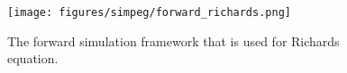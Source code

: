 \begin{figure}[!htbp]
\begin{center}
\texttt{[image: figures/simpeg/forward\_richards.png]}
\end{center}
\caption{
The forward simulation framework that is used for Richards equation.
}
\label{fig:simpeg-forward_richards}
\end{figure}

